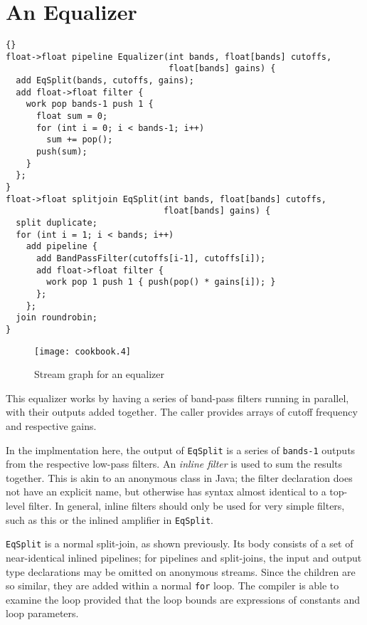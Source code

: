 \section{An Equalizer}

\begin{lstlisting}{}
float->float pipeline Equalizer(int bands, float[bands] cutoffs,
                                float[bands] gains) {
  add EqSplit(bands, cutoffs, gains);
  add float->float filter {
    work pop bands-1 push 1 {
      float sum = 0;
      for (int i = 0; i < bands-1; i++)
        sum += pop();
      push(sum);
    }
  };
}
float->float splitjoin EqSplit(int bands, float[bands] cutoffs,
                               float[bands] gains) {
  split duplicate;
  for (int i = 1; i < bands; i++)
    add pipeline {
      add BandPassFilter(cutoffs[i-1], cutoffs[i]);
      add float->float filter {
        work pop 1 push 1 { push(pop() * gains[i]); }
      };
    };
  join roundrobin;
}
\end{lstlisting}

\begin{figure}[htbp]
  \begin{center}
    \texttt{[image: cookbook.4]}
    \caption{Stream graph for an equalizer}
    \label{fig:equalizer}
  \end{center}
\end{figure}

This equalizer works by having a series of band-pass filters running
in parallel, with their outputs added together.  The caller provides
arrays of cutoff frequency and respective gains.

In the implmentation here, the output of \lstinline|EqSplit| is a
series of \lstinline|bands-1| outputs from the respective low-pass
filters.  An \emph{inline filter} is used to sum the results
together.  This is akin to an anonymous class in Java; the filter
declaration does not have an explicit name, but otherwise has syntax
almost identical to a top-level filter.  In general, inline filters
should only be used for very simple filters, such as this or the
inlined amplifier in \lstinline|EqSplit|.

\lstinline|EqSplit| is a normal split-join, as shown previously.  Its
body consists of a set of near-identical inlined pipelines; for
pipelines and split-joins, the input and output type declarations may
be omitted on anonymous streams.  Since the children are so similar,
they are added within a normal \lstinline|for| loop.  The compiler is
able to examine the loop provided that the loop bounds are expressions
of constants and loop parameters.
